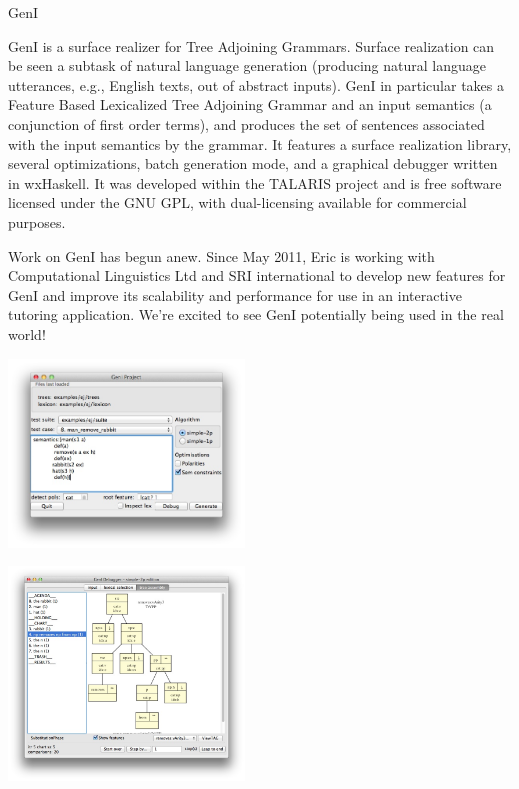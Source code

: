 \begin{hcarentry}[updated]{GenI}
\label{geni}
\makeheader

GenI is a surface realizer for Tree Adjoining Grammars.  Surface
realization can be seen a subtask of natural language generation
(producing natural language utterances, e.g., English texts, out of
abstract inputs).  GenI in particular takes a Feature Based
Lexicalized Tree Adjoining Grammar and an
input semantics (a conjunction of first order terms), and produces the
set of sentences associated with the input semantics by the grammar.  It
features a surface realization library, several optimizations, batch
generation mode, and a graphical debugger written in wxHaskell.  It was
developed within the TALARIS project and is free software licensed under
the GNU GPL, with dual-licensing available for commercial purposes.

Work on GenI has begun anew.  Since May 2011, Eric is working with
Computational Linguistics Ltd and SRI international to develop new
features for GenI and improve its scalability and performance for use in
an interactive tutoring application. We're excited to see GenI
potentially being used in the real world!

\begin{center}
\includegraphics[width=0.47\textwidth]{html/GenI-main-screenshot.jpg}
\end{center}

\begin{center}
\includegraphics[width=0.47\textwidth]{html/GenI-debugger-screenshot.jpg}
\end{center}


\end{hcarentry}
